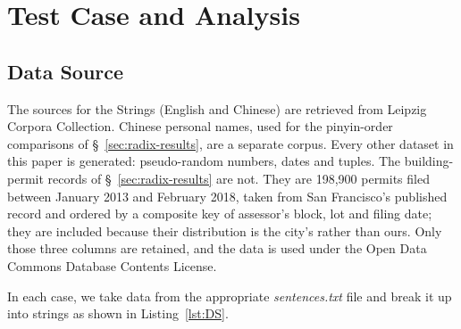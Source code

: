 \documentclass[twoside,leqno,twocolumn]{article}
\begin{document}
\section{Test Case and Analysis}

\subsection{Data Source}
\label{sec:data-source}
The sources for the Strings (English and  Chinese) are retrieved from Leipzig Corpora Collection\cite{GOLDHAHN12.327}.
Chinese personal names, used for the pinyin-order comparisons of \S~\ref{sec:radix-results}, are a separate corpus\cite{wainshine2020chinesenames}.
Every other dataset in this paper is generated: pseudo-random numbers, dates and tuples.
The building-permit records of \S~\ref{sec:radix-results} are not.
They are 198,900 permits filed between January 2013 and February 2018, taken from San Francisco's published
record\cite{sf-building-permits} and ordered by a composite key of assessor's block, lot and filing
date; they are included because their distribution is the city's rather than ours.
Only those three columns are retained, and the data is used under the Open Data Commons Database
Contents License.

In each case, we take data from the appropriate \emph{sentences.txt} file and break it up into strings as shown in Listing~\ref{lst:DS}.
\end{document}
